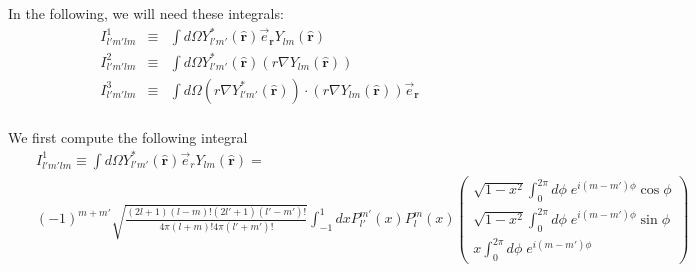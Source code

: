 \documentclass[aps,prb,floatfix,epsfig,singlecolumn,showpacs,preprintnumbers]{revtex4}
\renewcommand{\vr}{{\mathbf{r}}}
\begin{document}
In the following, we will need these integrals:
\begin{eqnarray}
I^1_{l'm'lm} &\equiv& \int d\Omega Y^*_{l'm'}(\hat{\vr}) \vec{e}_\vr  Y_{lm}(\hat{\vr}) \\
I^2_{l'm'lm} &\equiv& \int d\Omega Y^*_{l'm'}(\hat{\vr}) (r\nabla Y_{lm}(\hat{\vr})) \\
I^3_{l'm'lm} &\equiv& \int d\Omega (r\nabla Y^*_{l'm'}(\hat{\vr}))\cdot ( r\nabla  Y_{lm}(\hat{\vr})) \vec{e}_\vr\\
\end{eqnarray}

We first compute the following integral
\begin{eqnarray}
&&I^1_{l'm'lm}\equiv\int d\Omega Y^*_{l'm'}(\hat{\vr}) \vec{e}_r Y_{lm}(\hat{\vr})=\\
&&(-1)^{m+m'}
\sqrt{\frac{(2l+1)(l-m)!(2l'+1)(l'-m')!}{4\pi(l+m)! 4\pi (l'+m')!}}
\int_{-1}^1 dx 
 P_{l'}^{m'}(x) P_l^m(x) 
\left(
\begin{array}{c}
\sqrt{1-x^2} \int_0^{2\pi} d\phi\;  e^{i(m-m')\phi}\cos\phi \\
\sqrt{1-x^2} \int_0^{2\pi} d\phi\;  e^{i(m-m')\phi}\sin\phi\\
x \int_0^{2\pi} d\phi\;  e^{i(m-m')\phi}
\end{array}
\right)
\end{eqnarray}
\end{document}
